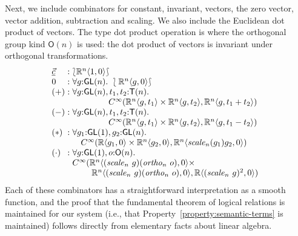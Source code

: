\documentclass{sigplanconf}
\newcommand{\typeOfCartSp}[1]{\lbag #1 \rbag}
\theoremstyle{examplestyle}
\begin{document}
Next, we include combinators for constant, invariant, vectors, the
zero vector, vector addition, subtraction and scaling. We also include
the Euclidean dot product of vectors. The type dot product operation
is where the orthogonal group kind $\mathsf{O}(n)$ is used: the dot
product of vectors is invariant under orthogonal transformations.
\begin{displaymath}
  \begin{array}{l@{\hspace{0.3em}}c@{\hspace{0.3em}}l}
    \underline{\vec{c}} &:& \typeOfCartSp{\mathbb{R}^n\langle 1, 0 \rangle} \\
    0 &:& \forall g \mathord: \mathsf{GL}(n).~\typeOfCartSp{\mathbb{R}^n\langle g, 0 \rangle} \\
    (+) &:&
    \begin{array}[t]{@{}l}
      \forall g \mathord: \mathsf{GL}(n), t_1,t_2 \mathord: \mathsf{T}(n). \\
      \hspace{1.5cm} C^\infty(\mathbb{R}^n\langle g, t_1 \rangle \times \mathbb{R}^n\langle g, t_2 \rangle, \mathbb{R}^n\langle g, t_1 + t_2 \rangle)\\
    \end{array} \\
    (-) &:&
    \begin{array}[t]{@{}l}
      \forall g \mathord: \mathsf{GL}(n), t_1,t_2 \mathord: \mathsf{T}(n). \\
      \hspace{1.5cm} C^\infty(\mathbb{R}^n\langle g, t_1 \rangle \times \mathbb{R}^n\langle g, t_2 \rangle, \mathbb{R}^n\langle g, t_1 - t_2 \rangle)\\
    \end{array} \\
    (*) &:&
    \begin{array}[t]{@{}l}
      \forall g_1 \mathord: \mathsf{GL}(1), g_2 \mathord: \mathsf{GL}(n).\\
      \quad C^\infty(\mathbb{R}\langle g_1, 0 \rangle \times \mathbb{R}^n\langle g_2, 0\rangle, \mathbb{R}^n\langle \mathit{scale}_n(g_1)g_2, 0 \rangle)
    \end{array}
    \\
    (\cdot) &:& 
    \begin{array}[t]{@{}l}
      \forall g \mathord: \mathsf{GL}(1), o \mathord: \mathsf{O}(n).~\\
      C^\infty(\mathbb{R}^n\langle (\mathit{scale}_n~g)(\mathit{ortho}_n~o), 0 \rangle \times \\
      \quad\quad\; \mathbb{R}^n\langle (\mathit{scale}_n~g)(\mathit{ortho}_n~o), 0\rangle, \mathbb{R}\langle (\mathit{scale}_n~g)^2, 0 \rangle)
    \end{array}
  \end{array}
\end{displaymath}
Each of these combinators has a straightforward interpretation as a
smooth function, and the proof that the fundamental theorem of logical
relations is maintained for our system (i.e., that
Property~\ref{property:semantic-terms} is maintained) follows
directly from elementary facts about linear algebra.
\end{document}
